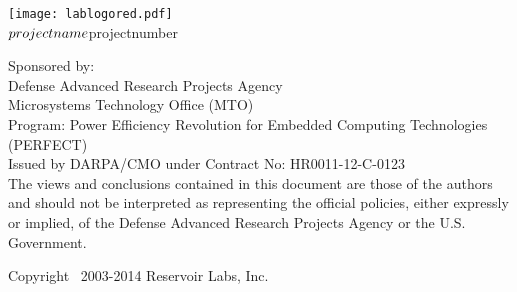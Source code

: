 \documentclass[letterpaper]{book}
\begin{document}
\hypersetup{pageanchor=false,citecolor=blue}
\begin{titlepage}
\vspace*{1cm}
\begin{center}
\texttt{[image: lablogored.pdf]} \\
\vspace{-3.5cm}
{\large $projectname \\ $projectnumber }\\
\vspace*{1cm}
\vspace*{0.5cm}
\end{center}
\end{titlepage}
\clearpage
\vspace*{15.0cm}

{\small
Sponsored by: \\
Defense Advanced Research Projects Agency \\
Microsystems Technology Office (MTO) \\
Program: Power Efficiency Revolution for Embedded Computing Technologies (PERFECT) \\
Issued by DARPA/CMO under Contract No: HR0011-12-C-0123 \\

The views and conclusions contained in this document are those of the authors 
and should not be interpreted as representing the official policies, either 
expressly or implied, of the Defense Advanced Research Projects Agency or the 
U.S. Government.

Copyright \textcopyright ~2003-2014 Reservoir Labs, Inc.
}
\tableofcontents
\clearemptydoublepage
{}
\hypersetup{pageanchor=true,citecolor=blue}
\end{document}
